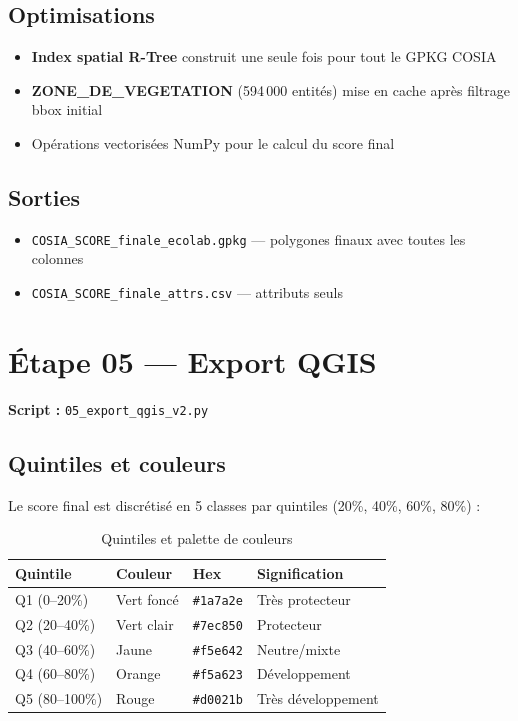 \documentclass[11pt,a4paper]{report}
\newcommand{\code}[1]{\texttt{\small #1}}
\begin{document}
\subsection{Optimisations}

\begin{itemize}
  \item \textbf{Index spatial R-Tree} construit une seule fois pour tout le GPKG COSIA
  \item \textbf{ZONE\_DE\_VEGETATION} (594\,000 entités) mise en cache après filtrage bbox initial
  \item Opérations vectorisées NumPy pour le calcul du score final
\end{itemize}

\subsection{Sorties}

\begin{itemize}
  \item \code{COSIA\_SCORE\_finale\_ecolab.gpkg} — polygones finaux avec toutes les colonnes
  \item \code{COSIA\_SCORE\_finale\_attrs.csv} — attributs seuls
\end{itemize}

\section{Étape 05 — Export QGIS}

\textbf{Script :} \code{05\_export\_qgis\_v2.py}

\subsection{Quintiles et couleurs}

Le score final est discrétisé en 5 classes par quintiles (20\%, 40\%, 60\%, 80\%) :

\begin{table}[H]
\centering
\begin{tabular}{llll}
\toprule
\rowcolor{seuilgris!75}
\textbf{Quintile} & \textbf{Couleur} & \textbf{Hex} & \textbf{Signification} \\
\midrule
\rowcolor{scoreQ1!20} Q1 (0–20\%) & Vert foncé & \code{\#1a7a2e} & Très protecteur \\
\rowcolor{scoreQ2!20} Q2 (20–40\%) & Vert clair & \code{\#7ec850} & Protecteur \\
\rowcolor{scoreQ3!20} Q3 (40–60\%) & Jaune & \code{\#f5e642} & Neutre/mixte \\
\rowcolor{scoreQ4!20} Q4 (60–80\%) & Orange & \code{\#f5a623} & Développement \\
\rowcolor{scoreQ5!20} Q5 (80–100\%) & Rouge & \code{\#d0021b} & Très développement \\
\bottomrule
\end{tabular}
\caption{Quintiles et palette de couleurs}
\end{table}
\end{document}

